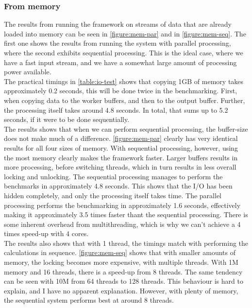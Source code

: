 \documentclass[a4paper]{article}
\begin{document}
\subsubsection{From memory}
The results from running the framework on streams of data that are already loaded into memory can be seen in \autoref{figure:mem-par} and in \autoref{figure:mem-seq}. The first one shows the results from running the system with parallel processing, where the second exhibits sequential processing. This is the ideal case, where we have a fast input stream, and we have a somewhat large amount of processing power available.\\

The practical timings in \autoref{table:io-test} shows that copying 1GB of memory takes approximately 0.2 seconds, this will be done twice in the benchmarking. First, when copying data to the worker buffers, and then to the output buffer. Further, the processing itself takes around 4.8 seconds. In total, that sums up to 5.2 seconds, if it were to be done sequentially.\\

The results shows that when we can perform sequential processing, the buffer-size does not make much of a difference. \autoref{figure:mem-par} clearly has very identical results for all four sizes of memory. With sequential processing, however, using the most memory clearly makes the framework faster. Larger buffers results in more processing, before switching threads, which in turn results in less overall locking and unlocking. The sequential processing manages to perform the benchmarks in approximately 4.8 seconds. This shows that the I/O has been hidden completely, and only the processing itself takes time. The parallel processing performs the benchmarking in approximately 1.6 seconds, effectively making it approximately 3.5 times faster thant the sequential processing. There is some inherent overhead from multithreading, which is why we can't achieve a 4 times speed-up with 4 cores.\\

The results also shows that with 1 thread, the timings match with performing the calculations in sequence. \autoref{figure:mem-seq} shows that with smaller amounts of memory, the locking becomes more expensive, with multiple threads. With 1M memory and 16 threads, there is a speed-up from 8 threads. The same tendency can be seen with 10M from 64 threads to 128 threads. This behaviour is hard to explain, and I have no apparent explanation. However, with plenty of memory, the sequential system performs best at around 8 threads. 
\end{document}
